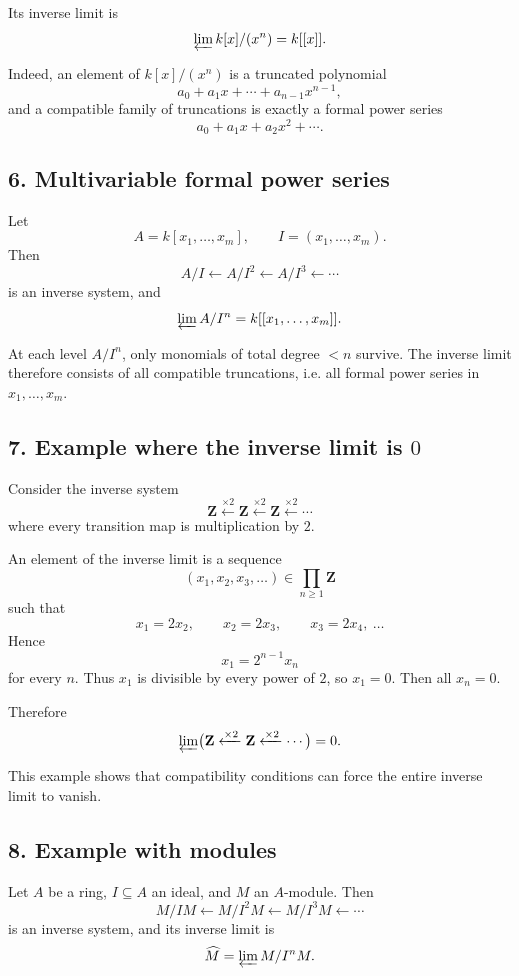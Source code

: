 \documentclass[12pt,a4paper]{article}
\theoremstyle{plain}
\theoremstyle{definition}      %
\begin{document}
	Its inverse limit is
	\[
	\varprojlim k[x]/(x^n)=k[[x]].
	\]
	
	Indeed, an element of \(k[x]/(x^n)\) is a truncated polynomial
	\[
	a_0+a_1x+\cdots+a_{n-1}x^{n-1},
	\]
	and a compatible family of truncations is exactly a formal power series
	\[
	a_0+a_1x+a_2x^2+\cdots.
	\]
	
	\subsection*{6. Multivariable formal power series}
	
	Let
	\[
	A=k[x_1,\dots,x_m],\qquad I=(x_1,\dots,x_m).
	\]
	Then
	\[
	A/I \xleftarrow{} A/I^2 \xleftarrow{} A/I^3 \xleftarrow{}\cdots
	\]
	is an inverse system, and
	\[
	\varprojlim A/I^n = k[[x_1,\dots,x_m]].
	\]
	
	At each level \(A/I^n\), only monomials of total degree \(<n\) survive. The inverse limit therefore consists of all compatible truncations, i.e. all formal power series in \(x_1,\dots,x_m\).
	
	\subsection*{7. Example where the inverse limit is \(0\)}
	
	Consider the inverse system
	\[
	\mathbf Z \xleftarrow{\times 2} \mathbf Z \xleftarrow{\times 2} \mathbf Z \xleftarrow{\times 2}\cdots
	\]
	where every transition map is multiplication by \(2\).
	
	An element of the inverse limit is a sequence
	\[
	(x_1,x_2,x_3,\dots)\in \prod_{n\ge1}\mathbf Z
	\]
	such that
	\[
	x_1=2x_2,\qquad x_2=2x_3,\qquad x_3=2x_4,\ \dots
	\]
	Hence
	\[
	x_1=2^{n-1}x_n
	\]
	for every \(n\). Thus \(x_1\) is divisible by every power of \(2\), so \(x_1=0\). Then all \(x_n=0\).
	
	Therefore
	\[
	\varprojlim\bigl(\mathbf Z \xleftarrow{\times 2}\mathbf Z \xleftarrow{\times 2}\cdots\bigr)=0.
	\]
	
	This example shows that compatibility conditions can force the entire inverse limit to vanish.
	
	\subsection*{8. Example with modules}
	
	Let \(A\) be a ring, \(I\subseteq A\) an ideal, and \(M\) an \(A\)-module. Then
	\[
	M/IM \xleftarrow{} M/I^2M \xleftarrow{} M/I^3M \xleftarrow{}\cdots
	\]
	is an inverse system, and its inverse limit is
	\[
	\widehat M=\varprojlim M/I^nM.
	\]
	
\end{document}
